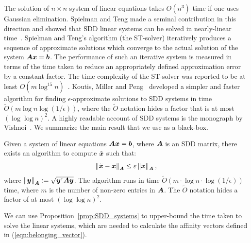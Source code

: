 The solution of $n \times n$ system of linear equations takes $O(n^3)$ time 
if one uses Gaussian elimination. Spielman and Teng made a seminal contribution in this direction and 
showed that SDD linear systems can be solved in nearly-linear 
time~\cite{ST04,EEST05,ST08}. Spielman and Teng's algorithm (the ST-solver)
iteratively produces a sequence of approximate solutions which converge to the 
actual solution of the system $\boldsymbol{A} \boldsymbol{x} = \boldsymbol{b}$. The performance 
of such an iterative system is measured in terms of the time taken to reduce 
an appropriately defined approximation error by a constant factor. The time 
complexity of the ST-solver was reported to be at least $O(m \log^{15} n)$~\cite{KMP11}.  
Koutis, Miller and Peng~\cite{KMP10,KMP11} developed a simpler and faster algorithm 
for finding $\epsilon$-approximate solutions to SDD systems in time 
$\tilde{O}(m \log n \log (1/\epsilon) )$, where the $\tilde{O}$ notation hides 
a factor that is at most $(\log \log n)^2$. A highly readable account 
of SDD systems is the monograph by Vishnoi~\cite{Vis13}. We summarize the 
main result that we use as a black-box.  
\begin{proposition} \label{prop:SDD_systems} {{\rm \cite{KMP11,Vis13}}}
	Given a system of linear equations $\boldsymbol{A} \boldsymbol{x} = \boldsymbol{b}$, where $\boldsymbol{A}$
	is an SDD matrix, there exists an algorithm to compute $\tilde{\boldsymbol{x}}$  
	such that:
		\[
			\left \| \tilde{\boldsymbol{x}} - \boldsymbol{x} \right \|_{\boldsymbol{A}} \leq \varepsilon \left \| \boldsymbol{x} \right \|_{\boldsymbol{A}}, 
		\]
	where $\left \| \boldsymbol{y} \right \|_{\boldsymbol{A}} := \sqrt{{\boldsymbol{y}}^{\scriptscriptstyle \mathsf{T}} \boldsymbol{A} \boldsymbol{y}}$. The algorithm runs in 
	time $\tilde{O}(m \cdot \log n \cdot \log (1 / \epsilon) )$ time, where $m$ is the number of non-zero 
	entries in $\boldsymbol{A}$. The $\tilde{O}$ notation hides a factor of at most $(\log \log n)^2$.
\end{proposition} 

We can use Proposition~\ref{prop:SDD_systems} to upper-bound the time taken to solve
the linear systems, which are needed to calculate the affinity vectors defined in (\ref{eqn:belonging_vector}).

